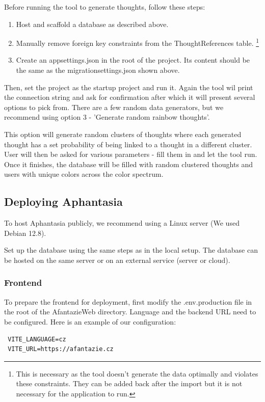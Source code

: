 Before running the tool to generate thoughts, follow these steps:
\begin{enumerate}
  \item Host and scaffold a database as described above.
  \item Manually remove foreign key constraints from the ThoughtReferences table.
  \footnote{This is necessary as the tool doesn't generate the data optimally and violates these constraints.
 They can be added back after the import but it is not necessary for the application to run.}
  \item Create an appsettings.json in the root of the project.
 Its content should be the same as the migrationsettings.json shown above.
\end{enumerate}

Then, set the project as the startup project and run it.
Again the tool wil print the connection string and ask for confirmation after which it will present several options to pick from.
There are a few random data generators, but we recommend using option 3 - 'Generate random rainbow thoughts'.

This option will generate random clusters of thoughts where each generated thought has a set probability
of being linked to a thought in a different cluster.
User will then be asked for various parameters - fill them in and let the tool run.
Once it finishes, the database will be filled with random clustered thoughts
and users with unique colors across the color spectrum.

\subsection{Deploying Aphantasia}
To host Aphantasia publicly, we recommend using a Linux server (We used Debian 12.8).

Set up the database using the same steps as in the local setup.
The database can be hosted on the same server or on an external service (server or cloud).

\subsubsection{Frontend}
To prepare the frontend for deployment, first modify the .env.production file in the root of the AfantazieWeb directory.
Language and the backend URL need to be configured. Here is an example of our configuration:
\begin{lstlisting}
 VITE_LANGUAGE=cz
 VITE_URL=https://afantazie.cz
\end{lstlisting}

